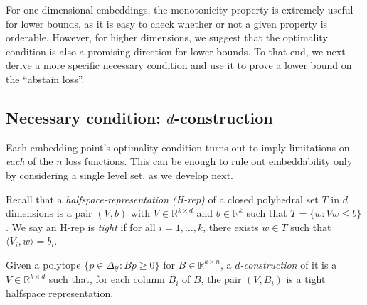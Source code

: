 \documentclass[anon,12pt]{colt2019}
\newcommand{\Comments}{1}
\newcommand{\mynote}[2]{\ifnum\Comments=1\textcolor{#1}{#2}\fi}
\newcommand{\raf}[1]{\mynote{green}{[RF: #1]}}
\newcommand{\bo}[1]{\mynote{blue}{[Bo: #1]}}
\newcommand{\reals}{\mathbb{R}}
\newcommand{\Y}{\mathcal{Y}}
\begin{document}
For one-dimensional embeddings, the monotonicity property is extremely useful for lower bounds, as it is easy to check whether or not a given property is orderable.
However, for higher dimensions, we suggest that the optimality condition is also a promising direction for lower bounds.
To that end, we next derive a more specific necessary condition and use it to prove a lower bound on the ``abstain loss''.


\subsection{Necessary condition: $d$-construction}

Each embedding point's optimality condition turns out to imply limitations on \emph{each} of the $n$ loss functions.
This can be enough to rule out embeddability only by considering a single level set, as we develop next.

Recall that a \emph{halfspace-representation (H-rep)} of a closed polyhedral set $T$ in $d$ dimensions is a pair $(V,b)$ with $V \in \reals^{k \times d}$ and $b \in \reals^k$ such that $T = \{ w : Vw \leq b \}$.
We say an H-rep is \emph{tight} if for all $i=1,\dots,k$, there exists $w \in T$ such that $\langle V_i , w \rangle = b_i$.

\begin{definition}\label{def:d-construction}
  Given a polytope $\{p \in \Delta_{\Y} : Bp \geq 0\}$ for $B \in \reals^{k \times n}$, a \emph{$d$-construction} of it is a $V \in \reals^{k \times d}$ such that, for each column $B_i$ of $B$, the pair $(V,B_i)$ is a tight halfspace representation.
\end{definition}
\end{document}
